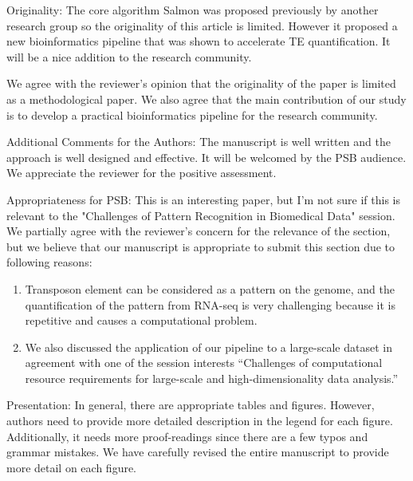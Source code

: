\documentclass[10pt]{article}
\begin{document}
\begin{response}{Originality: The core algorithm Salmon was proposed previously by another research group so the originality of this article is limited. However it proposed a new bioinformatics pipeline that was shown to accelerate TE quantification. It will be a nice addition to the research community.}
 
We agree with the reviewer's opinion that the originality of the paper is limited as a methodological paper. We also agree that the main contribution of our study is to develop a practical bioinformatics pipeline for the research community. 
\end{response}

\begin{response}{Additional Comments for the Authors: The manuscript is well written and the approach is well designed and effective. It will be welcomed by the PSB audience.}
We appreciate the reviewer for the positive assessment. 
\end{response}

\begin{response}{Appropriateness for PSB: This is an interesting paper, but I’m not sure if this is relevant to the "Challenges of Pattern Recognition in Biomedical Data" session.}
We partially agree with the reviewer's concern for the relevance of the section, but we believe that our manuscript is appropriate to submit this section due to following reasons:

\begin{enumerate}
\item Transposon element can be considered as a pattern on the genome, and the quantification of the pattern from RNA-seq is very challenging because it is repetitive and causes a computational problem.
\item We also discussed the application of our pipeline to a large-scale dataset
in agreement with one of the session interests 
``Challenges of computational resource requirements for large-scale and high-dimensionality data analysis.''
\end{enumerate}
\end{response}
\begin{response}{Presentation: In general, there are appropriate tables and figures. However, authors need to provide more detailed description in the legend for each figure. Additionally, it needs more proof-readings since there are a few typos and grammar mistakes.}
We have carefully revised the entire manuscript to provide more detail on each figure.
\end{response}
\end{document}
